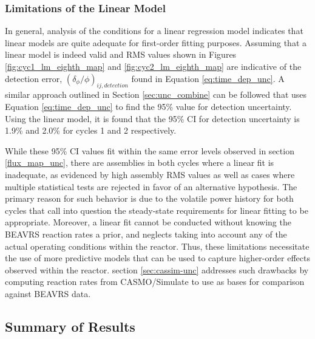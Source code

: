 \documentclass{article}
\begin{document}
\subsubsection{Limitations of the Linear Model}\label{sec:lm_limitations}

In general, analysis of the conditions for a linear regression model indicates that linear models are quite adequate for first-order fitting purposes. Assuming that a linear model is indeed valid and RMS values shown in Figures \ref{fig:cyc1_lm_eighth_map} and \ref{fig:cyc2_lm_eighth_map} are indicative of the detection error, $\left(\delta_\phi/\phi \right)_{ij,detection}$ found in Equation \ref{eq:time_dep_unc}. A similar approach outlined in Section \ref{sec:unc_combine} can be followed that uses Equation \ref{eq:time_dep_unc} to find the 95\% value for detection uncertainty. Using the linear model, it is found that the 95\% CI for detection uncertainty is 1.9\% and 2.0\% for cycles 1 and 2 respectively.

While these 95\% CI values fit within the same error levels observed in section \ref{flux_map_unc}, there are assemblies in both cycles where a linear fit is inadequate, as evidenced by high assembly RMS values as well as cases where multiple statistical tests are rejected in favor of an alternative hypothesis. The primary reason for such behavior is due to the volatile power history for both cycles that call into question the steady-state requirements for linear fitting to be appropriate. Moreover, a linear fit cannot be conducted without knowing the BEAVRS reaction rates a prior, and neglects taking into account any of the actual operating conditions within the reactor. Thus, these limitations necessitate the use of more predictive models that can be used to capture higher-order effects observed within the reactor. section \ref{sec:cassim-unc} addresses such drawbacks by computing reaction rates from CASMO/Simulate to use as bases for comparison against BEAVRS data.

\subsection{Summary of Results}\label{sec:timeseries_summary}
\end{document}
